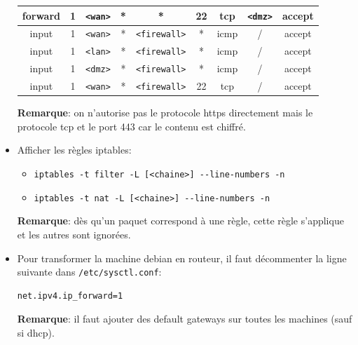 \documentclass[a4paper]{article}
\begin{document}
\begin{itemize}
\begin{center}
\begin{tabular}{|c|c|c|c|c|c|c|c|c|}
    forward & 1 &
    \texttt{<wan>} & * & * & 22 &
    tcp & \texttt{<dmz>} & accept \\ \hline \hline


    input & 1 &
    \texttt{<wan>} & * & \texttt{<firewall>} & * &
    icmp & / & accept \\ \hline

    input & 1 &
    \texttt{<lan>} & * & \texttt{<firewall>} & * &
    icmp & / & accept \\ \hline

    input & 1 &
    \texttt{<dmz>} & * & \texttt{<firewall>} & * &
    icmp & / & accept \\ \hline \hline


    input & 1 &
    \texttt{<wan>} & * & \texttt{<firewall>} & 22 &
    tcp & / & accept \\ \hline

\end{tabular} \end{center}
\textbf{Remarque}: on n'autorise pas le protocole https directement mais le protocole tcp et le port 443 car le contenu est chiffré.


\item Afficher les règles iptables:
\begin{example}
    \begin{itemize}
        \item \texttt{iptables -t filter -L [<chaine>] -{}-line-numbers -n}
        \item \texttt{iptables -t nat -L [<chaine>] -{}-line-numbers -n}
    \end{itemize}
\end{example}
\textbf{Remarque}: dès qu'un paquet correspond à une règle, cette règle s'applique et les autres sont ignorées.


\item Pour transformer la machine debian en routeur, il faut décommenter la ligne suivante dans \texttt{/etc/sysctl.conf}:
\begin{example} \begin{verbatim}
net.ipv4.ip_forward=1
\end{verbatim} \end{example}
\textbf{Remarque}: il faut ajouter des default gateways sur toutes les machines (sauf si dhcp).



\end{itemize}
\end{document}
